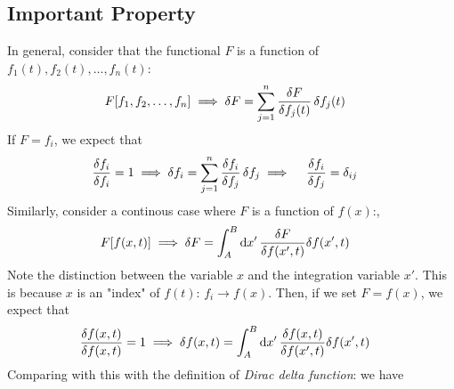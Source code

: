 \subsection{Important Property}
In general, consider that the functional $F$ is a function of $f_1(t), f_2(t), \ldots, f_n(t)$:
\begin{align}
  F[f_1, f_2, \ldots, f_n] \implies \fdif{F} & = \sum_{j=1}^{n} \fdv{F}{f_j(t)} \fdif{f_j(t)}
\end{align}
If $F = f_i$, we expect that
\begin{align}
  \fdv{f_i}{f_i} & = 1 \implies \fdif{f_i} = \sum_{j=1}^{n} \fdv{f_i}{f_j} \fdif{f_j}
  \implies \quad \fdv{f_i}{f_j} = \delta_{ij} \label{eq:func_deriv_kronecker_delta}
\end{align}
Similarly, consider a continous case where $F$ is a function of $f(x)$:,
\begin{align}
  F[f(x,t)] \implies \fdif{F} & = \int_A^B \odif{x'} \, \fdv{F}{f(x',t)} \delta{f(x',t)}
\end{align}
Note the distinction between the variable $x$ and the integration variable $x'$. This is because $x$ is an "index" of $f(t)$: $f_i \to f(x)$.
Then, if we set $F = f(x)$, we expect that
\begin{align}
  \fdv{f(x, t)}{f(x, t)} & = 1 \implies \delta{f(x, t)} = \int_A^B \odif{x'} \, \fdv{f(x,t)}{f(x',t)} \delta{f(x',t)}
\end{align}
Comparing with this with the definition of \emph{Dirac delta function}:
we have
\newpage
{}

\cite{eman-functionalDerivative}
